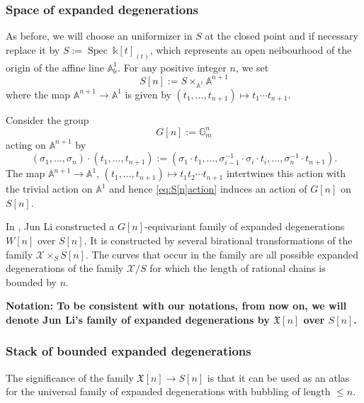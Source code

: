\documentclass[11pt]{amsart}
\DeclareMathOperator{\Spec}{Spec}
\theoremstyle{plain}
\numberwithin{equation}{section}
\theoremstyle{definition}
\theoremstyle{plain}
\begin{document}
\subsubsection{\textbf{Space of expanded degenerations}}
As before, we will choose an uniformizer in $S$ at the closed point and if necessary replace it by $S:=\Spec~ \mathbb k[t]_{(t)}$, which represents an open neibourhood of the origin of the affine line $\mathbb A^1_{\mathbb k}$. For any positive integer $n$, we set
\begin{equation}
S[n]:=S\times_{\mathbb A^1} \mathbb A^{n+1}
\end{equation}
where the map $\mathbb A^{n+1}\longrightarrow \mathbb A^1$ is given by $(t_1, \dots, t_{n+1})\mapsto t_1\cdots t_{n+1}$. 

Consider the group
\begin{equation}
G[n]:=\mathbb G_m^{n}
\end{equation}
acting on $\mathbb A^{n+1}$ by 
\begin{equation} \label{eq:S[n]action}
(\sigma_1, \ldots, \sigma_n)\cdot (t_1, \ldots, t_{n+1}):=(\sigma_1\cdot t_1,\ldots, \sigma_{i-1}^{-1}\cdot\sigma_{i}\cdot t_i, \ldots, \sigma_{n}^{-1}\cdot t_{n+1}).
\end{equation}
The map $\mathbb{A}^{n+1} \to \mathbb{A}^{1}$, $(t_{1},\ldots,t_{n+1}) \mapsto t_{1}t_{2}\cdots t_{n+1}$ intertwines this action with the trivial action on $\mathbb{A}^{1}$ and hence 
\eqref{eq:S[n]action} induces an action of $G[n]$ on $S[n]$.

In \cite[Section 1.1]{Li}, Jun Li constructed a $G[n]$-equivariant family of expanded degenerations $W[n]$ over $S[n]$. It is constructed by several birational transformations of the family $\mathcal X\times_S S[n]$. The curves that occur in the family are all possible expanded degenerations of the family $\mathcal X/S$ for which the length of rational chains is bounded by $n$.

\smallskip

\textbf{Notation: To be consistent with our notations, from now on, we will denote Jun Li's family of expanded degenerations by $\mathfrak X[n]$ over $S[n]$.}

\subsubsection{\textbf{Stack of bounded expanded degenerations}} 
The significance of the family $\mathfrak X[n] \to S[n]$ is that it can be used as an atlas for the universal family of expanded degenerations with bubbling of length $\leq n$.
\end{document}
